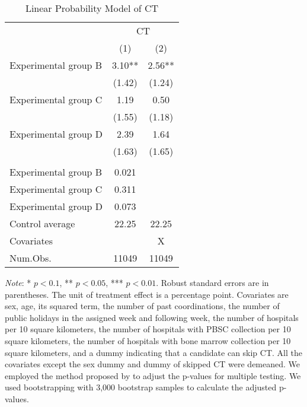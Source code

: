 \documentclass[12pt, a4paper]{article}
\begin{document}
\begin{table}

\caption{\label{tab:lm-test}Linear Probability Model of CT}
\centering
\fontsize{8}{10}\selectfont
\begin{threeparttable}
\begin{tabular}[t]{>{\raggedright\arraybackslash}p{20em}cc}
\toprule
\multicolumn{1}{c}{ } & \multicolumn{2}{c}{CT} \\
\cmidrule(l{3pt}r{3pt}){2-3}
  & (1) & (2)\\
\midrule
Experimental group B & \num{3.10}** & \num{2.56}**\\
 & (\num{1.42}) & (\num{1.24})\\
Experimental group C & \num{1.19} & \num{0.50}\\
 & (\num{1.55}) & (\num{1.18})\\
Experimental group D & \num{2.39} & \num{1.64}\\
 & (\num{1.63}) & (\num{1.65})\\
\midrule
\addlinespace[0.3em]
\multicolumn{3}{l}{\textit{Adjustment of p-values for multiple testing}}\\
\hspace{1em}Experimental group B & 0.021 & \\
\hspace{1em}Experimental group C & 0.311 & \\
\hspace{1em}Experimental group D & 0.073 & \\
Control average & 22.25 & 22.25\\
Covariates &  & X\\
Num.Obs. & \num{11049} & \num{11049}\\
\bottomrule
\end{tabular}
\begin{tablenotes}
\item \emph{Note}: * $p < 0.1$, ** $p < 0.05$, *** $p < 0.01$. Robust standard errors are in parentheses. The unit of treatment effect is a percentage point. Covariates are sex, age, its squared term, the number of past coordinations, the number of public holidays in the assigned week and following week, the number of hospitals per 10 square kilometers, the number of hospitals with PBSC collection per 10 square kilometers, the number of hospitals with bone marrow collection per 10 square kilometers, and a dummy indicating that a candidate can skip CT. All the covariates except the sex dummy and dummy of skipped CT were demeaned. We employed the method proposed by \citet{List2019} to adjust the p-values for multiple testing. We used bootstrapping with 3,000 bootstrap samples to calculate the adjusted p-values.
\end{tablenotes}
\end{threeparttable}
\end{table}
\end{document}

